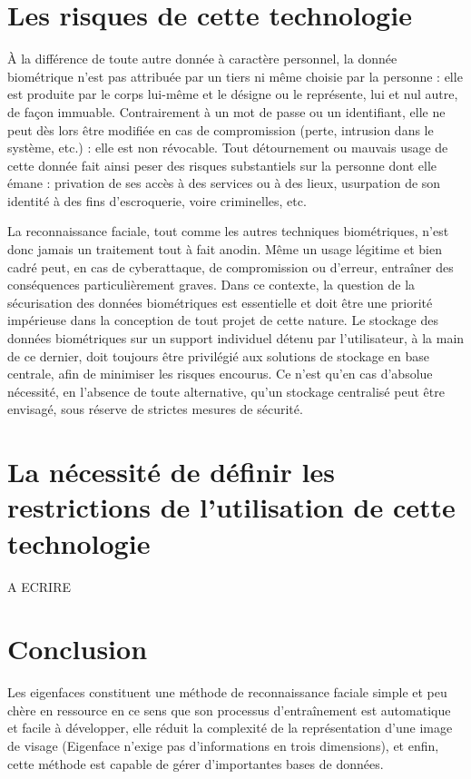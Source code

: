 \documentclass[12pt,french]{article}
\theoremstyle{plain}
\theoremstyle{definition}
\begin{document}
\section{Les risques de cette technologie}

À la différence de toute autre donnée à caractère personnel, la donnée biométrique n’est pas attribuée par un tiers ni même choisie par la personne : elle est produite par le corps lui-même et le désigne ou le représente, lui et nul autre, de façon immuable.
Contrairement à un mot de passe ou un identifiant, elle ne peut dès lors être modifiée en cas de compromission (perte, intrusion dans le système, etc.) : elle est non révocable.
Tout détournement ou mauvais usage de cette donnée fait ainsi peser des risques substantiels sur la personne dont elle émane : privation de ses accès à des services ou à des lieux, usurpation de son identité à des fins d’escroquerie, voire criminelles, etc.

La reconnaissance faciale, tout comme les autres techniques biométriques, n’est donc jamais un traitement tout à fait anodin.
Même un usage légitime et bien cadré peut, en cas de cyberattaque, de compromission ou d’erreur, entraîner des conséquences particulièrement graves.
Dans ce contexte, la question de la sécurisation des données biométriques est essentielle et doit être une priorité impérieuse dans la conception de tout projet de cette nature.
Le stockage des données biométriques sur un support individuel détenu par l’utilisateur, à la main de ce dernier, doit toujours être privilégié aux solutions de stockage en base centrale, afin de minimiser les risques encourus.
Ce n’est qu’en cas d’absolue nécessité, en l’absence de toute alternative, qu’un stockage centralisé peut être 
envisagé, sous réserve de strictes mesures de sécurité.

\section{La nécessité de définir les restrictions de l'utilisation de cette technologie}

A ECRIRE

\section*{Conclusion}
Les eigenfaces constituent une méthode de reconnaissance faciale simple et peu chère en ressource en ce sens que son processus d'entraînement est automatique et facile à développer,
elle réduit la complexité de la représentation d'une image de visage (Eigenface n'exige pas d'informations en trois dimensions), et enfin, cette méthode est capable de gérer d'importantes bases de données.
\end{document}
